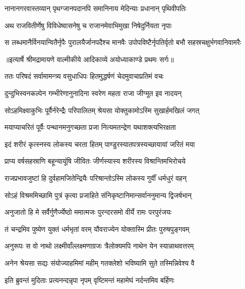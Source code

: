 \twolineshloka
{नानानगरवास्तव्यान् पृथग्जानपदानपि}
{समानिनाय मेदिन्याः प्रधानान् पृथिवीपतिः} %

\twolineshloka
{अथ राजवितीर्णेषु विविधेष्वासनेषु च}
{राजानमेवाभिमुखा निषेदुर्नियता नृपाः} %

\fourlineindentedshloka
{स लब्धमानैर्विनयान्वितैर्नृपैः}
{पुरालयैर्जानपदैश्च मानवैः}
{उपोपविष्टैर्नृपतिर्वृतो बभौ}
{सहस्रचक्षुर्भगवानिवामरैः} %


{॥इत्यार्षे श्रीमद्रामायणे वाल्मीकीये आदिकाव्ये अयोध्याकाण्डे प्रथमः सर्गः॥}


\twolineshloka
{ततः परिषदं सर्वामामन्त्र्य वसुधाधिपः}
{हितमुद्धर्षणं चेदमुवाचाप्रतिमं वचः} %

\twolineshloka
{दुन्दुभिस्वनकल्पेन गम्भीरेणानुनादिना}
{स्वरेण महता राजा जीग्मूत इव नादयन्} %

\twolineshloka
{सोऽहमिक्ष्वाकुभिः पूर्वैर्नरेन्द्रैः परिपालितम्}
{श्रेयसा योक्तुकामोऽस्मि सुखार्हमखिलं जगत्} %

\twolineshloka
{मयाप्याचरितं पूर्वैः पन्थानमनुगच्छता}
{प्रजा नित्यमतन्द्रेण यथाशक्त्यभिरक्षता} %

\twolineshloka
{इदं शरीरं कृत्स्नस्य लोकस्य चरता हितम्}
{पाण्डुरस्यातपत्रस्यच्छायायां जरितं मया} %

\twolineshloka
{प्राप्य वर्षसहस्राणि बहून्यायूंषि जीवितः}
{जीर्णस्यास्य शरीरस्य विश्रान्तिमभिरोचये} %

\twolineshloka
{राजप्रभावजुष्टां हि दुर्वहामजितेन्द्रियैः}
{परिश्रान्तोऽस्मि लोकस्य गुर्वीं धर्मधुरं वहन्} %

\twolineshloka
{सोऽहं विश्रममिच्छामि पुत्रं कृत्वा प्रजाहिते}
{संनिकृष्टानिमान्सर्वाननुमान्य द्विजर्षभान्} %

\twolineshloka
{अनुजातो हि मे सर्वैर्गुणैर्ज्येष्ठो ममात्मजः}
{पुरन्दरसमो वीर्ये रामः परपुरंजयः} %

\twolineshloka
{तं चन्द्रमिव पुष्येण युक्तं धर्मभृतां वरम्}
{यौवराज्येन योक्तास्मि प्रीतः पुरुषपुङ्गवम्} %

\twolineshloka
{अनुरूपः स वो नाथो लक्ष्मीवाँल्लक्ष्मणाग्रजः}
{त्रैलोक्यमपि नाथेन येन स्यान्नाथवत्तरम्} %

\twolineshloka
{अनेन श्रेयसा सद्यः संयोज्याहमिमां महीम्}
{गतक्लेशो भविष्यामि सुते तस्मिन्निवेश्य वै} %

\twolineshloka
{इति ब्रुवन्तं मुदिताः प्रत्यनन्दन्नृपा नृपम्}
{वृष्टिमन्तं महामेघं नर्दन्तमिव बर्हिणः} %

